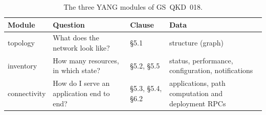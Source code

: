 \begin{table}[h]
\centering\small
\caption{The three YANG modules of GS~QKD~018.}
\label{tab:moduli}
\begin{tabularx}{\textwidth}{@{}l L l L@{}}
\toprule
\textbf{Module} & \textbf{Question} & \textbf{Clause} & \textbf{Data} \\
\midrule
topology & What does the network look like? & §5.1 & structure (graph) \\
inventory & How many resources, in which state? & §5.2, §5.5 &
status, performance, configuration, notifications \\
connectivity & How do I serve an application end to end? & §5.3, §5.4, §6.2 &
applications, path computation and deployment RPCs \\
\bottomrule
\end{tabularx}
\end{table}
